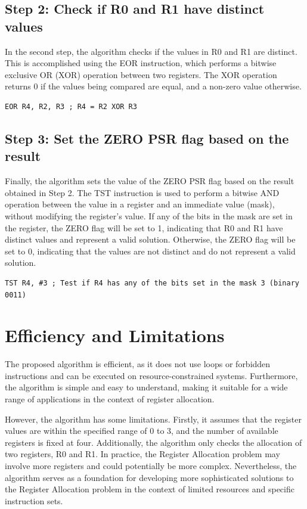 \subsection{Step 2: Check if R0 and R1 have distinct values}
In the second step, the algorithm checks if the values in R0 and R1 are distinct. This is accomplished using the EOR instruction, which performs a bitwise exclusive OR (XOR) operation between two registers. The XOR operation returns 0 if the values being compared are equal, and a non-zero value otherwise.

\begin{verbatim}
EOR R4, R2, R3 ; R4 = R2 XOR R3
\end{verbatim}

\subsection{Step 3: Set the ZERO PSR flag based on the result}
Finally, the algorithm sets the value of the ZERO PSR flag based on the result obtained in Step 2. The TST instruction is used to perform a bitwise AND operation between the value in a register and an immediate value (mask), without modifying the register's value. If any of the bits in the mask are set in the register, the ZERO flag will be set to 1, indicating that R0 and R1 have distinct values and represent a valid solution. Otherwise, the ZERO flag will be set to 0, indicating that the values are not distinct and do not represent a valid solution.

\begin{verbatim}
TST R4, #3 ; Test if R4 has any of the bits set in the mask 3 (binary 0011)
\end{verbatim}

\section{Efficiency and Limitations}
The proposed algorithm is efficient, as it does not use loops or forbidden instructions and can be executed on resource-constrained systems. Furthermore, the algorithm is simple and easy to understand, making it suitable for a wide range of applications in the context of register allocation.

However, the algorithm has some limitations. Firstly, it assumes that the register values are within the specified range of 0 to 3, and the number of available registers is fixed at four. Additionally, the algorithm only checks the allocation of two registers, R0 and R1. In practice, the Register Allocation problem may involve more registers and could potentially be more complex. Nevertheless, the algorithm serves as a foundation for developing more sophisticated solutions to the Register Allocation problem in the context of limited resources and specific instruction sets.



